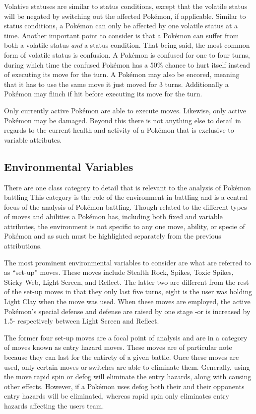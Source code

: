 \documentclass[12pt,twoside]{reedthesis}
\begin{document}
  Volative statuses are similar to status conditions, except that the
  volatile status will be negated by switching out the affected Pokémon,
  if applicable. Similar to status conditions, a Pokémon can only be
  affected by one volatile status at a time. Another important point to
  consider is that a Pokémon can suffer from both a volatile status
  \emph{and} a status condition. That being said, the most common form of
  volatile status is confusion. A Pokémon is confused for one to four
  turns, during which time the confused Pokémon has a 50\% chance to hurt
  itself instead of executing its move for the turn. A Pokémon may also be
  encored, meaning that it has to use the same move it just moved for 3
  turns. Additionally a Pokémon may flinch if hit before executing its
  move for the turn.
  
  Only currently active Pokémon are able to execute moves. Likewise, only
  active Pokémon may be damaged. Beyond this there is not anything else to
  detail in regards to the current health and activity of a Pokémon that
  is exclusive to variable attributes.
  
  \subsection{Environmental Variables}\label{environmental-variables}
  
  There are one class category to detail that is relevant to the analysis
  of Pokémon battling This category is the role of the environment in
  battling and is a central focus of the analysis of Pokémon battling.
  Though related to the different types of moves and abilities a Pokémon
  has, including both fixed and variable attributes, the environment is
  not specific to any one move, ability, or specie of Pokémon and as such
  must be highlighted separately from the previous attributions.
  
  The most prominent environmental variables to consider are what are
  referred to as ``set-up'' moves. These moves include Stealth Rock,
  Spikes, Toxic Spikes, Sticky Web, Light Screen, and Reflect. The latter
  two are different from the rest of the set-up moves in that they only
  last five turns, eight is the user was holding Light Clay when the move
  was used. When these moves are employed, the active Pokémon's special
  defense and defense are raised by one stage -or is increased by 1.5-
  respectively between Light Screen and Reflect.
  
  The former four set-up moves are a focal point of analysis and are in a
  category of moves known as entry hazard moves. These moves are of
  particular note because they can last for the entirety of a given
  battle. Once these moves are used, only certain moves or switches are
  able to eliminate them. Generally, using the move rapid spin or defog
  will eliminate the entry hazards, along with causing other effects.
  However, if a Pokémon uses defog both their and their opponents entry
  hazards will be eliminated, whereas rapid spin only eliminates entry
  hazards affecting the users team.
  
\end{document}
